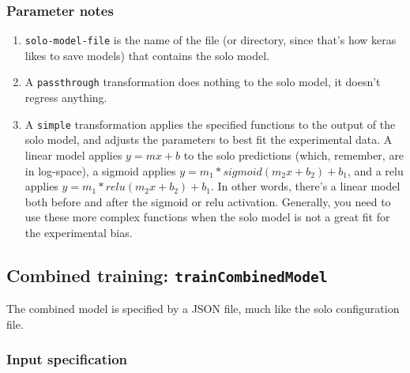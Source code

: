 \documentclass{article}
\begin{document}
\subsubsection{Parameter notes}

\begin{enumerate}
    \item \texttt{solo-model-file} is the name of the file (or directory, since that's how keras
        likes to save models) that contains the solo model.
    \item A \texttt{passthrough} transformation does nothing to the solo model, it doesn't
        regress anything.
    \item A \texttt{simple} transformation applies the specified functions to the output of the
        solo model, and adjusts the parameters to best fit the experimental data.
        A linear model applies $y=m x+b$ to the solo predictions (which, remember, are in
        log-space),
        a sigmoid applies $y = m_1 *sigmoid(m_2x+b_2) + b_1$,
        and a relu applies $y = m_1 * relu(m_2x+b_2) + b_1$.
        In other words, there's a linear model both before and after the sigmoid or relu
        activation.
        Generally, you need to use these more complex functions when the solo model is not a
        great fit for the experimental bias.
\end{enumerate}



\newpage

\subsection{Combined training: \texttt{trainCombinedModel}}\label{prog:trainCombinedModel}

The combined model is specified by a JSON file, much like the solo configuration file.

\subsubsection{Input specification}
\end{document}
